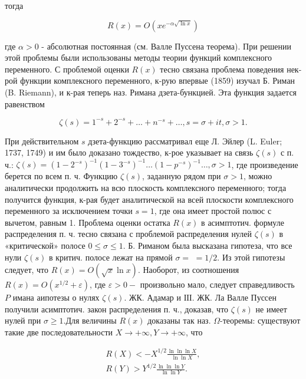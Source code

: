 \documentclass[10pt]{article}
\begin{document}
тогда



\[

R(x)=O\left(x e^{-\alpha \sqrt{\ln x}}\right)

\]



где $\alpha>0$ - абсолютная постоянная (см. Валле Пуссена теорема). При решении этой проблемы были использованы методы теории функций комплексного переменного. С проблемой оценки $R(x)$ тесно связана проблема поведения нек-рой функции комплексного переменного, к-рую впервые (1859) изучал Б. Риман (B. Riemann), и к-рая теперь наз. Римана дзета-бункцией. Эта функция задается равенством



\[

\zeta(s)=1^{-s}+2^{-s}+\ldots+n^{-s}+\ldots, s=\sigma+i t, \sigma>1 .

\]



При действительном $s$ дзета-функцию рассматривал еще Л. Эйлер (L. Euler; 1737, 1749) и им было доказано тождество, к-рое указывает на связь $\zeta(s)$ с п. ч.: $\zeta(s)=\left(1-2^{-s}\right)^{-1}\left(1-3^{-s}\right)^{-1} \ldots\left(1-p^{-s}\right)^{-1} \ldots, \sigma>1$, где произведение берется по всем п. ч. Функцию $\zeta(s)$, заданную рядом при $\sigma>1$, можно аналитически продолжить на всю плоскость комплексного переменного; тогда получится функция, к-рая будет аналитической на всей плоскости комплексного переменного за исключением точки $s=1$, где она имеет простой полюс с вычетом, равным 1. Проблема оценки остатка $R(x)$ в асимптотич. формуле распределения п. ч. тесно связана с проблемой распределения нулей $\zeta(s)$ в «критической» полосе $0 \leqslant \sigma \leqslant 1$. Б. Риманом была высказана гипотеза, что все нули $\zeta(s)$ в критич. полосе лежат на прямой $\sigma=$ $=1 / 2$. Из этой гипотезы следует, что $R(x)=O(\sqrt{x} \ln x)$. Наоборот, из соотношения $R(x)=O\left(x^{1 / 2}+\varepsilon\right)$, где $\varepsilon>0-$ произвольно мало, следует справедливость $P$ имана аипотезы о нулях $\zeta(s)$. ЖК. Адамар и ІІІ. ЖК. Ла Валле Пуссен получили асимптотич. закон распределения п. ч., доказав, что $\zeta(s)$ не имеет нулей при $\sigma \geqslant 1$.Для величины $R(x)$ доказаны так наз. $\Omega$-теоремы: существуют такие две последовательности $X \rightarrow+\infty, Y \rightarrow+\infty$, что



\[

\begin{gathered}

R(X)<-X^{1 / 2} \frac{\ln \ln \ln X}{\ln \ln X}, \\

R(Y)>Y^{1 / 2} \frac{\ln \ln \ln Y}{\ln \ln Y} .

\end{gathered}

\]
\end{document}

